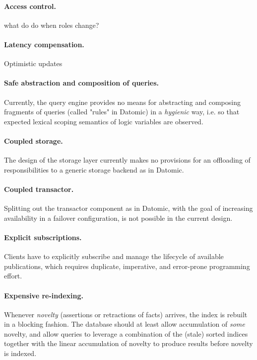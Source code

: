 \paragraph{Access control.} what do do when roles change?

\paragraph{Latency compensation.} Optimistic updates

\paragraph{Safe abstraction and composition of queries.} Currently, the query engine provides no means for abstracting and composing fragments of queries (called "rules" in Datomic) in a \emph{hygienic} way, i.e. so that expected lexical scoping semantics of logic variables are observed.

\paragraph{Coupled storage.} The design of the storage layer currently makes no provisions for an offloading of responsibilities to a generic storage backend as in Datomic.

\paragraph{Coupled transactor.} Splitting out the transactor component as in Datomic, with the goal of increasing availability in a failover configuration, is not possible in the current design.

\paragraph{Explicit subscriptions.} Clients have to explicitly subscribe and manage the lifecycle of available publications, which requires duplicate, imperative, and error-prone programming effort.

\paragraph{Expensive re-indexing.} Whenever \emph{novelty} (assertions or retractions of facts) arrives, the index is rebuilt in a blocking fashion. The database should at least allow accumulation of \emph{some} novelty, and allow queries to leverage a combination of the (stale) sorted indices together with the linear accumulation of novelty to produce results before novelty is indexed.

